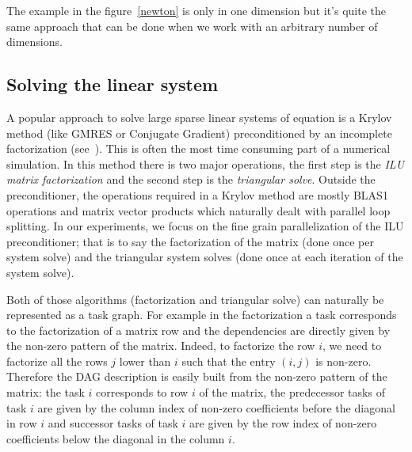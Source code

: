 The example in the figure~\ref{newton} is only in one dimension but it's quite the same approach that can be done when we work with an arbitrary number of dimensions.


\subsection{Solving the linear system}
A popular approach to solve large sparse linear systems of equation is a Krylov
method (like GMRES or Conjugate Gradient) preconditioned by an incomplete
factorization (see~\cite{Saad96IMSLS}).
%
This is often the most time consuming part of a numerical simulation.
%
In this method there is two major operations, the first step is the {\em ILU matrix factorization}
and the second step is the {\em triangular solve}.
Outside the preconditioner, the operations required in a Krylov method are
mostly BLAS1 operations and matrix vector products which naturally dealt with
parallel loop splitting.
In our experiments, we focus on the fine grain parallelization of
the ILU preconditioner; that is to say the factorization of the matrix (done once per system solve) and
the triangular system solves (done once at each iteration of the system solve).


Both of those algorithms (factorization and triangular solve) can naturally be represented as a task graph. For example in the factorization
a task corresponds to the factorization of a matrix row and the dependencies are directly given by the non-zero pattern of the matrix.
Indeed, to factorize the row $i$, we need to factorize all the rows $j$ lower than $i$
such that the entry $(i,j)$ is non-zero.
Therefore the DAG description is easily built from the non-zero pattern of the matrix:
the task $i$ corresponds to row $i$ of the matrix, the predecessor tasks of task $i$ are given by the column index of non-zero coefficients before the diagonal in row $i$
 and successor tasks of task $i$ are given by the row index of non-zero coefficients below the diagonal in the column $i$.

